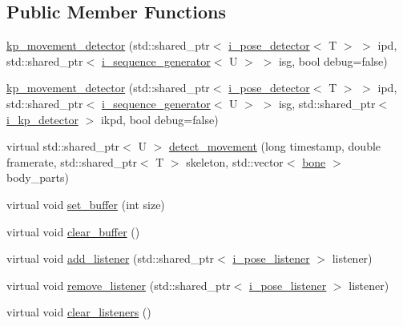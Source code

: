 \subsection*{Public Member Functions}
\begin{DoxyCompactItemize}
\item 
\hyperlink{classmae_1_1kp__movement__detector_a895e056f1ce3653b3ed71aec98b17941}{kp\-\_\-movement\-\_\-detector} (std\-::shared\-\_\-ptr$<$ \hyperlink{classmae_1_1i__pose__detector}{i\-\_\-pose\-\_\-detector}$<$ T $>$ $>$ ipd, std\-::shared\-\_\-ptr$<$ \hyperlink{classmae_1_1i__sequence__generator}{i\-\_\-sequence\-\_\-generator}$<$ U $>$ $>$ isg, bool debug=false)
\item 
\hyperlink{classmae_1_1kp__movement__detector_af9f13d86055607188453c57721d6227a}{kp\-\_\-movement\-\_\-detector} (std\-::shared\-\_\-ptr$<$ \hyperlink{classmae_1_1i__pose__detector}{i\-\_\-pose\-\_\-detector}$<$ T $>$ $>$ ipd, std\-::shared\-\_\-ptr$<$ \hyperlink{classmae_1_1i__sequence__generator}{i\-\_\-sequence\-\_\-generator}$<$ U $>$ $>$ isg, std\-::shared\-\_\-ptr$<$ \hyperlink{classmae_1_1i__kp__detector}{i\-\_\-kp\-\_\-detector} $>$ ikpd, bool debug=false)
\item 
virtual std\-::shared\-\_\-ptr$<$ U $>$ \hyperlink{classmae_1_1kp__movement__detector_a2aaa4c65a7735ac1d3ee201beb56b6b1}{detect\-\_\-movement} (long timestamp, double framerate, std\-::shared\-\_\-ptr$<$ T $>$ skeleton, std\-::vector$<$ \hyperlink{classmae_1_1bone}{bone} $>$ body\-\_\-parts)
\item 
virtual void \hyperlink{classmae_1_1kp__movement__detector_a673ed3ff4f7a5cd8a02cdbe254a4508e}{set\-\_\-buffer} (int size)
\item 
virtual void \hyperlink{classmae_1_1kp__movement__detector_a8fec5ae9e1f209fdcbeba3f86b5c3059}{clear\-\_\-buffer} ()
\item 
virtual void \hyperlink{classmae_1_1kp__movement__detector_a53f506b2d9c5bb759908a125af33f97d}{add\-\_\-listener} (std\-::shared\-\_\-ptr$<$ \hyperlink{classmae_1_1i__pose__listener}{i\-\_\-pose\-\_\-listener} $>$ listener)
\item 
virtual void \hyperlink{classmae_1_1kp__movement__detector_a6c93647920874e88c5b6293617cfdca2}{remove\-\_\-listener} (std\-::shared\-\_\-ptr$<$ \hyperlink{classmae_1_1i__pose__listener}{i\-\_\-pose\-\_\-listener} $>$ listener)
\item 
virtual void \hyperlink{classmae_1_1kp__movement__detector_a5333495e30be2b0d6205cd8266d2156d}{clear\-\_\-listeners} ()
\item 

\end{DoxyCompactItemize}

